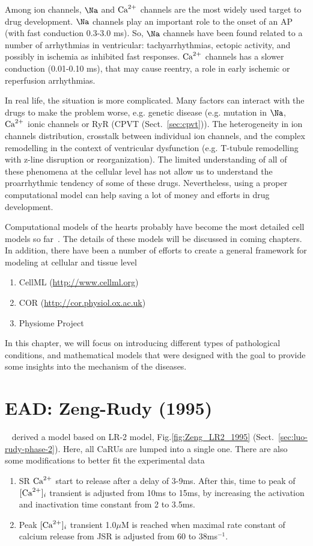 Among ion channels, $\Na$ and ${\text{Ca}^{2+}}$ channels are the most widely used target to
drug development. $\Na$ channels play an important role to the onset of an AP
(with fast conduction 0.3-3.0 ms). So, $\Na$ channels have been found related to
a number of arrhythmias in ventricular: tachyarrhythmias, ectopic activity, and
possibly in ischemia as  inhibited fast responses.  ${\text{Ca}^{2+}}$ channels has a slower
conduction (0.01-0.10 ms), that may cause reentry, a role in early ischemic or
reperfusion arrhythmias.  

In real life, the situation is more complicated. Many factors can interact with
the drugs to make the problem worse, e.g. genetic disease (e.g. mutation in
$\Na$, ${\text{Ca}^{2+}}$ ionic channels or RyR (CPVT (Sect.~\ref{sec:cpvt})). The
heterogeneity in ion channels distribution, crosstalk between individual ion
channels, and the complex remodelling in the context of ventricular dysfunction
(e.g. T-tubule remodelling with z-line disruption or reorganization). The
limited understanding of all of these phenomena at the cellular level has not
allow us to understand the proarrhythmic tendency of some of these drugs.
Nevertheless, using a proper computational model can help saving a lot of money
and efforts in drug development.

Computational models of the hearts probably have become the most detailed cell
models so far~\citep{noble2008}. The details of these models will be
discussed in coming chapters. In addition, there have been a number of efforts
to create a general framework for modeling at cellular and tissue level
\begin{enumerate}
\item CellML (\url{http://www.cellml.org})
\item COR (\url{http://cor.physiol.ox.ac.uk})
\item Physiome Project
\end{enumerate}
In this chapter, we will focus on introducing different types of pathological
conditions, and mathematical models that were designed with the goal to provide
some insights into the mechanism of the diseases.



\section{EAD: Zeng-Rudy (1995)}
\label{sec:ead:-zeng-rudy}

~\citep{zeng1995} derived a model based on LR-2 model,
Fig.\ref{fig:Zeng_LR2_1995}  (Sect.~\ref{sec:luo-rudy-phase-2}). Here, all CaRUs
are lumped into a single one. There are also some modifications to better fit
the experimental data
\begin{enumerate}
\item SR ${\text{Ca}^{2+}}$ start to release after a delay of 3-9ms. After this,
  time to peak of $[{\text{Ca}^{2+}}]_i$ transient is adjusted from 10ms to 15ms,
  by increasing  the activation and inactivation time constant from 2
  to 3.5ms.
\item Peak $[{\text{Ca}^{2+}}]_i$ transient 1.0$\mu$M is reached when maximal rate
  constant of calcium release from JSR is adjusted from 60 to
  38ms$^{-1}$. 
\end{enumerate}


